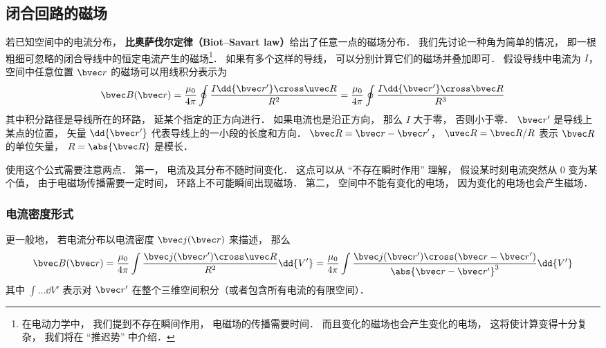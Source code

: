 
\subsection{闭合回路的磁场}
若已知空间中的电流分布， \textbf{比奥萨伐尔定律（Biot–Savart law）}给出了任意一点的磁场分布． 我们先讨论一种角为简单的情况， 即一根粗细可忽略的闭合导线中的恒定电流产生的磁场\footnote{在电动力学中， 我们提到不存在瞬间作用， 电磁场的传播需要时间． 而且变化的磁场也会产生变化的电场， 这将使计算变得十分复杂， 我们将在 “推迟势” 中介绍．}． 如果有多个这样的导线， 可以分别计算它们的磁场并叠加即可． 假设导线中电流为 $I$， 空间中任意位置 $\bvec r$ 的磁场可以用线积分表示为
\begin{equation}\label{BioSav_eq2}
\bvec B(\bvec r) = \frac{\mu_0}{4\pi} \oint \frac{I \dd{\bvec r'} \cross \uvec R}{R^2}
= \frac{\mu_0}{4\pi} \oint \frac{I \dd{\bvec r'} \cross \bvec R}{R^3}
\end{equation}
其中积分路径是导线所在的环路， 延某个指定的正方向进行． 如果电流也是沿正方向， 那么 $I$ 大于零， 否则小于零． $\bvec r'$ 是导线上某点的位置， 矢量 $\dd{\bvec r'}$ 代表导线上的一小段的长度和方向． $\bvec R = \bvec r - \bvec r'$， $\uvec R = \bvec R/R$ 表示 $\bvec R$ 的单位矢量， $R = \abs{\bvec R}$ 是模长．

使用这个公式需要注意两点． 第一， 电流及其分布不随时间变化． 这点可以从 “不存在瞬时作用” 理解， 假设某时刻电流突然从 0 变为某个值， 由于电磁场传播需要一定时间， 环路上不可能瞬间出现磁场． 第二， 空间中不能有变化的电场， 因为变化的电场也会产生磁场．%

\subsubsection{电流密度形式}
更一般地， 若电流分布以电流密度 $\bvec j(\bvec r)$ 来描述， 那么
\begin{equation}\label{BioSav_eq3}
\bvec B(\bvec r) = \frac{\mu_0}{4\pi} \int \frac{\bvec j(\bvec r') \cross \uvec R}{R^2} \dd{V'} = \frac{\mu_0}{4\pi} \int \frac{\bvec j(\bvec r') \cross (\bvec r - \bvec r')}{\abs{\bvec r - \bvec r'}^3} \dd{V'}
\end{equation}
其中 $\int \dots \dd{V'}$ 表示对 $\bvec r'$ 在整个三维空间积分（或者包含所有电流的有限空间）．

